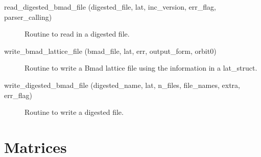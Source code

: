 \begin{description}
\label{r:read.digested.bmad.file}
\item[read_digested_bmad_file (digested_file, lat, inc_version, err_flag, parser_calling)] \Newline
Routine to read in a digested file. 

\label{r:write.bmad.lattice.file}
\item[write_bmad_lattice_file (bmad_file, lat, err, output_form, orbit0)] \Newline 
Routine to write a Bmad lattice file using the information in
a lat_struct.

\label{r:write.digested.bmad.file}
\item[write_digested_bmad_file (digested_name, lat, n_files, file_names, extra, err_flag)] \Newline
Routine to write a digested file. 
\end{description}

\section{Matrices}
\label{r:mat}

